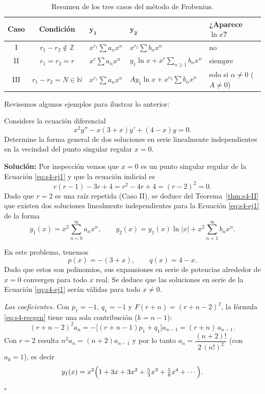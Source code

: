 \begin{table}[H]
\centering
\small
\caption{Resumen de los tres casos del método de Frobenius.}
\label{tab:s4-casos}
\begin{tabular}{|c|c|p{3.2cm}|p{4.6cm}|p{2.8cm}|}
\hline
\rowcolor{bbe!15}\textbf{Caso} & \textbf{Condición} & $\mathbf{y_1}$ & $\mathbf{y_2}$ & \textbf{¿Aparece $\ln x$?} \\ \hline
I & $r_1-r_2\notin\mathbb Z$ & $x^{r_1}\sum a_nx^n$ & $x^{r_2}\sum b_nx^n$ & no \\ \hline
II & $r_1=r_2=r$ & $x^{r}\sum a_nx^n$ & $y_1\ln x+x^{r}\sum_{n\ge1}b_nx^n$ & siempre \\ \hline
III & $r_1-r_2=N\in\mathbb N$ & $x^{r_1}\sum a_nx^n$ & $Ay_1\ln x+x^{r_2}\sum b_nx^n$ & solo si $\alpha\neq0$ ($A\ne0$) \\ \hline
\end{tabular}
\end{table}
 
Revisemos algunos ejemplos para ilustrar lo anterior:
 
\begin{example}\label{ex:s4-doble}
    Considere la ecuación diferencial
\begin{equation}
x^2 y'' - x(3 + x)y' + (4 - x)y = 0.
\label{eq:s4-ej1}
\end{equation}
Determine la forma general de dos soluciones en serie linealmente independientes en la vecindad del punto singular regular $x = 0$.
 
\noindent \textbf{Solución:} \quad Por inspección vemos que $x = 0$ es un punto singular regular de la Ecuación \eqref{eq:s4-ej1} y que la ecuación indicial es
\[ r(r - 1) - 3r + 4 = r^2 - 4r + 4 = (r - 2)^2 = 0. \]
Dado que $r = 2$ es una raíz repetida (Caso II), se deduce del Teorema~\ref{thm:s4-II} que existen dos soluciones linealmente independientes para la Ecuación \eqref{eq:s4-ej1} de la forma
\[ y_1(x) = x^2 \sum_{n=0}^{\infty} a_n x^n, \qquad y_2(x) = y_1(x) \ln |x| + x^2 \sum_{n=1}^{\infty} b_n x^n. \]
 
En este problema, tenemos
\[ p(x) = -(3 + x), \qquad q(x) = 4 - x. \]
Dado que estos son polinomios, sus expansiones en serie de potencias alrededor de $x = 0$ convergen para todo $x$ real. Se deduce que las soluciones en serie de la Ecuación \eqref{eq:s4-ej1} serán válidas para todo $x \neq 0$.
 
\vspace{.2cm}
\noindent\textit{Los coeficientes.} Con $p_1=-1$, $q_1=-1$ y $F(r+n)=(r+n-2)^2$, la fórmula \eqref{eq:s4-recgen} tiene una sola contribución ($k=n-1$):
\[ (r+n-2)^2a_n=-\bigl[(r+n-1)p_1+q_1\bigr]a_{n-1}=(r+n)\,a_{n-1}. \]
Con $r=2$ resulta $n^2a_n=(n+2)a_{n-1}$ y por lo tanto $a_n=\dfrac{(n+2)!}{2\,(n!)^2}$ (con $a_0=1$), es decir
\[ y_1(x)=x^2\Bigl(1+3x+3x^2+\tfrac53x^3+\tfrac{5}{8}x^4+\cdots\Bigr). \]
\hfill $\square$
\end{example}
 
